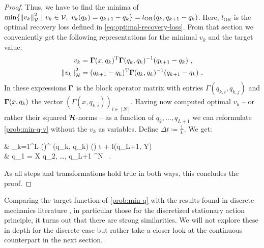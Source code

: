 \begin{proof}
	Thus, we have to find the minima of $\min\{\norm{v_k}_{\mathcal{V}}^2\ |\ v_k \in \mathcal{V},\ v_k(q_k) = q_{k+1} - q_k\} = l_{\text{OR}}(q_k, q_{k+1} - q_k)$.
	Here, $l_{\text{OR}}$ is the optimal recovery loss defined in \cref{eq:optimal-recovery-loss}.
	From that section we conveniently get the following representations for the minimal $v_k$ and the target value:
	\begin{align}
		v_k & = \mathbf{\Gamma}(x, q_k)^\mathrm{T}\mathbf{\Gamma}(q_k, q_k)^{-1} (q_{k+1} - q_k) \ ,\\
		\norm{v_k}_{\mathcal{H}}^2 &= (q_{k+1} - q_k)^\mathrm{T} \mathbf{\Gamma}(q_k, q_k)^{-1} (q_{k+1} - q_k) \ .
	\end{align}
	In these expressions $\mathbf{\Gamma}$ is the block operator matrix with entries $\Gamma(q_{k,i}, q_{k, j})$ and $\mathbf{\Gamma}(x, q_k)$ the vector $(\Gamma(x, q_{k, i}))_{i \in [N]}$.
	Having now computed optimal $v_k$ -- or rather their squared $\mathcal{H}$-norms -- as a function of $q_2, \ldots, q_{L+1}$ we can reformulate \cref{prob:min-q-v} without the $v_k$ as variables.
	Define $\Delta t \coloneqq \frac{1}{L}$.
	We get:
	\begin{problem}
		\begin{cases}
			 & \nu \cdot {} \sum_{k=1}^{L}  
			\left(\right)^ \bGamma(q_k, q_k)
			\left(\right) \cdot \Delta t
			+ l(q_{L+1}, Y) \\
			 & q_1 = X  q_2, \ldots, q_{L+1} \in \cX^N \ .
		\end{cases}
	\end{problem}
	As all steps and transformations hold true in both ways, this concludes the proof.
\end{proof}

Comparing the target function of \cref{prob:min-q} with the results found in discrete mechanics literature \cite[~Chapter VI.6.2]{hairer06}, in particular those for the discretized stationary action principle, it turns out that there are strong similarities.
We will not explore these in depth for the discrete case but rather take a closer look at the continuous counterpart in the next section.